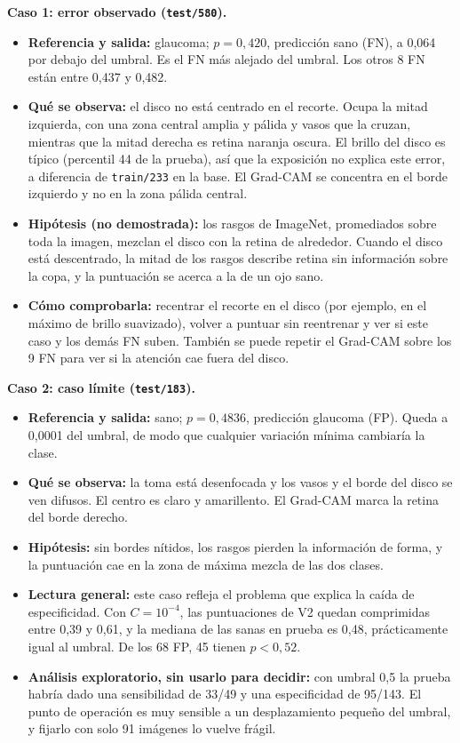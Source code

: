 \documentclass[pdflatex,sn-mathphys-num]{sn-jnl}%
\theoremstyle{thmstyleone}%
\theoremstyle{thmstyletwo}%
\theoremstyle{thmstylethree}%
\begin{document}
\textbf{Caso 1: error observado (\texttt{test/580}).}
\begin{itemize}
\item \textbf{Referencia y salida:} glaucoma; $p=0{,}420$, predicción sano (FN), a 0,064 por debajo del umbral. Es el FN más alejado del umbral. Los otros 8 FN están entre 0,437 y 0,482.
\item \textbf{Qué se observa:} el disco no está centrado en el recorte. Ocupa la mitad izquierda, con una zona central amplia y pálida y vasos que la cruzan, mientras que la mitad derecha es retina naranja oscura. El brillo del disco es típico (percentil 44 de la prueba), así que la exposición no explica este error, a diferencia de \texttt{train/233} en la base. El Grad-CAM se concentra en el borde izquierdo y no en la zona pálida central.
\item \textbf{Hipótesis (no demostrada):} los rasgos de ImageNet, promediados sobre toda la imagen, mezclan el disco con la retina de alrededor. Cuando el disco está descentrado, la mitad de los rasgos describe retina sin información sobre la copa, y la puntuación se acerca a la de un ojo sano.
\item \textbf{Cómo comprobarla:} recentrar el recorte en el disco (por ejemplo, en el máximo de brillo suavizado), volver a puntuar sin reentrenar y ver si este caso y los demás FN suben. También se puede repetir el Grad-CAM sobre los 9 FN para ver si la atención cae fuera del disco.
\end{itemize}

\textbf{Caso 2: caso límite (\texttt{test/183}).}
\begin{itemize}
\item \textbf{Referencia y salida:} sano; $p=0{,}4836$, predicción glaucoma (FP). Queda a 0,0001 del umbral, de modo que cualquier variación mínima cambiaría la clase.
\item \textbf{Qué se observa:} la toma está desenfocada y los vasos y el borde del disco se ven difusos. El centro es claro y amarillento. El Grad-CAM marca la retina del borde derecho.
\item \textbf{Hipótesis:} sin bordes nítidos, los rasgos pierden la información de forma, y la puntuación cae en la zona de máxima mezcla de las dos clases.
\item \textbf{Lectura general:} este caso refleja el problema que explica la caída de especificidad. Con $C=10^{-4}$, las puntuaciones de V2 quedan comprimidas entre 0,39 y 0,61, y la mediana de las sanas en prueba es 0,48, prácticamente igual al umbral. De los 68 FP, 45 tienen $p<0{,}52$.
\item \textbf{Análisis exploratorio, sin usarlo para decidir:} con umbral 0,5 la prueba habría dado una sensibilidad de 33/49 y una especificidad de 95/143. El punto de operación es muy sensible a un desplazamiento pequeño del umbral, y fijarlo con solo 91 imágenes lo vuelve frágil.
\end{itemize}
\end{document}
